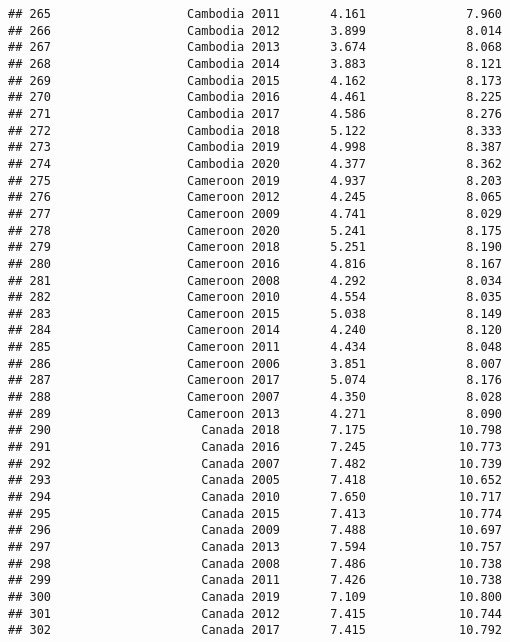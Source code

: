 \documentclass[
]{article}
\begin{document}
\begin{verbatim}
## 265                   Cambodia 2011       4.161              7.960
## 266                   Cambodia 2012       3.899              8.014
## 267                   Cambodia 2013       3.674              8.068
## 268                   Cambodia 2014       3.883              8.121
## 269                   Cambodia 2015       4.162              8.173
## 270                   Cambodia 2016       4.461              8.225
## 271                   Cambodia 2017       4.586              8.276
## 272                   Cambodia 2018       5.122              8.333
## 273                   Cambodia 2019       4.998              8.387
## 274                   Cambodia 2020       4.377              8.362
## 275                   Cameroon 2019       4.937              8.203
## 276                   Cameroon 2012       4.245              8.065
## 277                   Cameroon 2009       4.741              8.029
## 278                   Cameroon 2020       5.241              8.175
## 279                   Cameroon 2018       5.251              8.190
## 280                   Cameroon 2016       4.816              8.167
## 281                   Cameroon 2008       4.292              8.034
## 282                   Cameroon 2010       4.554              8.035
## 283                   Cameroon 2015       5.038              8.149
## 284                   Cameroon 2014       4.240              8.120
## 285                   Cameroon 2011       4.434              8.048
## 286                   Cameroon 2006       3.851              8.007
## 287                   Cameroon 2017       5.074              8.176
## 288                   Cameroon 2007       4.350              8.028
## 289                   Cameroon 2013       4.271              8.090
## 290                     Canada 2018       7.175             10.798
## 291                     Canada 2016       7.245             10.773
## 292                     Canada 2007       7.482             10.739
## 293                     Canada 2005       7.418             10.652
## 294                     Canada 2010       7.650             10.717
## 295                     Canada 2015       7.413             10.774
## 296                     Canada 2009       7.488             10.697
## 297                     Canada 2013       7.594             10.757
## 298                     Canada 2008       7.486             10.738
## 299                     Canada 2011       7.426             10.738
## 300                     Canada 2019       7.109             10.800
## 301                     Canada 2012       7.415             10.744
## 302                     Canada 2017       7.415             10.792

\end{verbatim}
\end{document}
